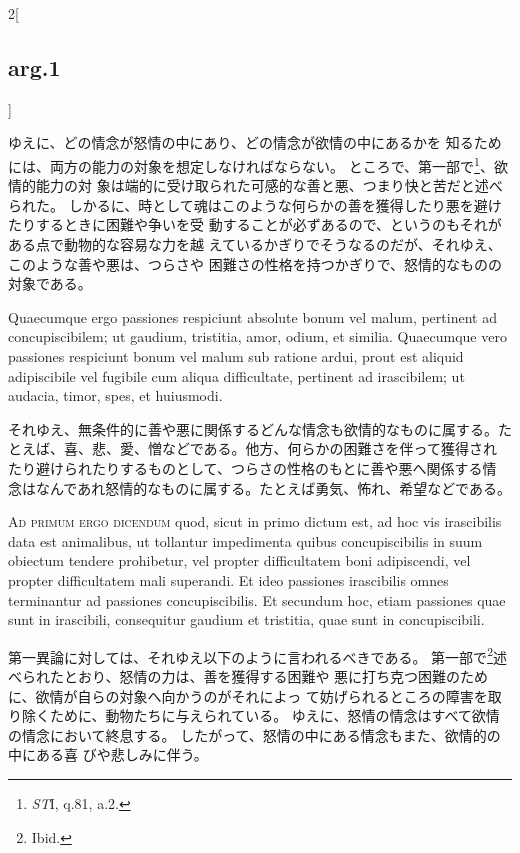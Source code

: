 \documentclass[paper=a4paper,fontsize=10pt,jafontsize=9pt,titlepage]{jlreq}
\begin{document}
\begin{paracol}{2}[\subsection{arg.1}]
\switchcolumn

ゆえに、どの情念が怒情の中にあり、どの情念が欲情の中にあるかを
 知るためには、両方の能力の対象を想定しなければならない。
ところで、第一部で\footnote{{\itshape ST}I, q.81, a.2.}、欲情的能力の対
 象は端的に受け取られた可感的な善と悪、つまり快と苦だと述べられた。
しかるに、時として魂はこのような何らかの善を獲得したり悪を避けたりするときに困難や争いを受
 動することが必ずあるので、というのもそれがある点で動物的な容易な力を越
 えているかぎりでそうなるのだが、それゆえ、このような善や悪は、つらさや
 困難さの性格を持つかぎりで、怒情的なものの対象である。

\switchcolumn*

Quaecumque ergo passiones respiciunt absolute bonum vel
malum, pertinent ad concupiscibilem; ut gaudium, tristitia, amor, odium,
et similia. Quaecumque vero passiones respiciunt bonum vel malum sub
ratione ardui, prout est aliquid adipiscibile vel fugibile cum aliqua
difficultate, pertinent ad irascibilem; ut audacia, timor, spes, et
huiusmodi.

\switchcolumn

それゆえ、無条件的に善や悪に関係するどんな情念も欲情的なものに属する。た
 とえば、喜、悲、愛、憎などである。他方、何らかの困難さを伴って獲得され
 たり避けられたりするものとして、つらさの性格のもとに善や悪へ関係する情
 念はなんであれ怒情的なものに属する。たとえば勇気、怖れ、希望などである。

\switchcolumn*[\subsection{ad.1}]

{\scshape Ad primum ergo dicendum} quod, sicut in primo dictum est, ad hoc vis
irascibilis data est animalibus, ut tollantur impedimenta quibus
concupiscibilis in suum obiectum tendere prohibetur, vel propter
difficultatem boni adipiscendi, vel propter difficultatem mali
superandi. Et ideo passiones irascibilis omnes terminantur ad passiones
concupiscibilis. Et secundum hoc, etiam passiones quae sunt in
irascibili, consequitur gaudium et tristitia, quae sunt in
concupiscibili.

\switchcolumn

第一異論に対しては、それゆえ以下のように言われるべきである。
第一部で\footnote{Ibid.}述べられたとおり、怒情の力は、善を獲得する困難や
悪に打ち克つ困難のために、欲情が自らの対象へ向かうのがそれによっ
 て妨げられるところの障害を取り除くために、動物たちに与えられている。
ゆえに、怒情の情念はすべて欲情の情念において終息する。
 したがって、怒情の中にある情念もまた、欲情的の中にある喜
 びや悲しみに伴う。


\end{paracol}
\end{document}
